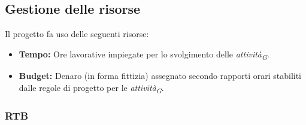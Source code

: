 \subsection{Gestione delle risorse}
Il progetto fa uso delle seguenti risorse:

\begin{itemize}
  \item \textbf{Tempo:} Ore lavorative impiegate per lo svolgimento delle \textit{attività}\textsubscript{\textit{G}}.
  \item \textbf{Budget:} Denaro (in forma fittizia) assegnato secondo rapporti orari stabiliti dalle regole di progetto per le \textit{attività}\textsubscript{\textit{G}}.
\end{itemize}
\subsubsection{RTB}
